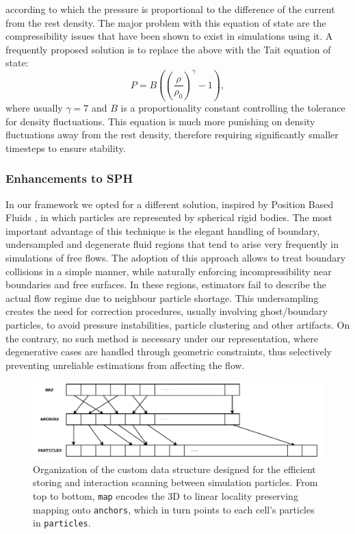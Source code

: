 \documentclass{llncs}
\begin{document}
according to which the pressure is proportional to the difference of the current from the
rest density. The major problem with this equation of state are the compressibility issues
that have been shown to exist in simulations using it. A frequently proposed solution is
to replace the above with the Tait equation of state:
\begin{equation}
  \label{eq:tait-state}
  P = B \left( \left( \frac{\rho}{\rho_0} \right)^\gamma - 1 \right),
\end{equation}
where usually $\gamma=7$ and $B$ is a proportionality constant controlling the tolerance
for density fluctuations. This equation is much more punishing on density fluctuations
away from the rest density, therefore requiring significantly smaller timesteps to ensure
stability.

\subsubsection{Enhancements to SPH} In our framework we opted for a different solution,
inspired by Position Based Fluids \cite{macklin2013position}, in which particles are
represented by spherical rigid bodies. The most important advantage of this technique is
the elegant handling of boundary, undersampled and degenerate fluid regions that tend to
arise very frequently in simulations of free flows. The adoption of this approach allows
to treat boundary collisions in a simple manner, while naturally enforcing
incompressibility near boundaries and free surfaces. In these regions, estimators fail to
describe the actual flow regime due to neighbour particle shortage. This undersampling
creates the need for correction procedures, usually involving ghost/boundary particles, to
avoid pressure instabilities, particle clustering and other artifacts. On the contrary, no
such method is necessary under our representation, where degenerative cases are handled
through geometric constraints, thus selectively preventing unreliable estimations from
affecting the flow.

\begin{figure}
  \includegraphics[width=\textwidth]{../report/figures/lp-grid.pdf}
  \caption{Organization of the custom data structure designed for the efficient storing
    and interaction scanning between simulation particles. From top to bottom,
    \texttt{map} encodes the 3D to linear locality preserving mapping onto
    \texttt{anchors}, which in turn points to each cell's particles in
    \texttt{particles}.}
  \label{fig:lp-grid}
\end{figure}
\end{document}
